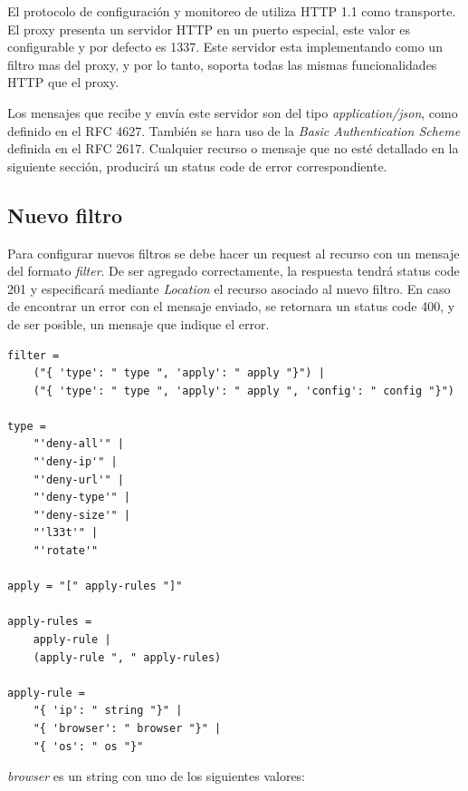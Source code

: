 \documentclass[11pt,a4paper,titlepage]{article}
\begin{document}
El protocolo de configuración y monitoreo de \duta utiliza HTTP 1.1 como transporte.
El proxy presenta un servidor HTTP en un puerto especial, este valor es configurable y por defecto es 1337.
Este servidor esta implementando como un filtro mas del proxy, y por lo tanto, soporta todas las mismas funcionalidades HTTP que el proxy.

Los mensajes que recibe y envía este servidor son del tipo \textit{application/json}, como definido en el RFC 4627.
También se hara uso de la \textit{Basic Authentication Scheme} definida en el RFC 2617.
Cualquier recurso o mensaje que no esté detallado en la siguiente sección, producirá un status code de error correspondiente.

\subsection{Nuevo filtro}
\label{sec:new-filter}
Para configurar nuevos filtros se debe hacer un request  al recurso  con un mensaje del formato \textit{filter}.
De ser agregado correctamente, la respuesta tendrá status code 201 y especificará mediante \textit{Location} el recurso asociado al nuevo filtro.
En caso de encontrar un error con el mensaje enviado, se retornara un status code 400, y de ser posible, un mensaje que indique el error.

\begin{verbatim}
filter =
    ("{ 'type': " type ", 'apply': " apply "}") |
    ("{ 'type': " type ", 'apply': " apply ", 'config': " config "}")

type =
    "'deny-all'" |
    "'deny-ip'" |
    "'deny-url'" |
    "'deny-type'" |
    "'deny-size'" |
    "'l33t'" |
    "'rotate'"

apply = "[" apply-rules "]"

apply-rules =
    apply-rule |
    (apply-rule ", " apply-rules)

apply-rule =
    "{ 'ip': " string "}" |
    "{ 'browser': " browser "}" |
    "{ 'os': " os "}"

\end{verbatim}

\textit{browser} es un string con uno de los siguientes valores:
\end{document}
